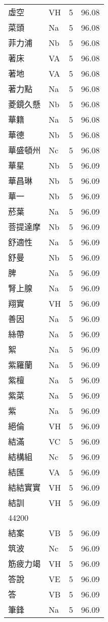 \documentclass[twocolumn]{book}
\begin{document}
\begin{supertabular}{llrr}
虛空 & VH & 5 &  96.08\\
菜頭 & Na & 5 &  96.08\\
菲力浦 & Nb & 5 &  96.08\\
著床 & VA & 5 &  96.08\\
著地 & VA & 5 &  96.08\\
著力點 & Na & 5 &  96.08\\
菱鏡久懸 & Nb & 5 &  96.08\\
華籍 & Na & 5 &  96.08\\
華德 & Nb & 5 &  96.08\\
華盛頓州 & Nc & 5 &  96.08\\
華星 & Nb & 5 &  96.09\\
華昌琳 & Nb & 5 &  96.09\\
華一 & Nb & 5 &  96.09\\
菸葉 & Na & 5 &  96.09\\
菩提達摩 & Nb & 5 &  96.09\\
舒適性 & Na & 5 &  96.09\\
舒曼 & Nb & 5 &  96.09\\
脾 & Na & 5 &  96.09\\
腎上腺 & Na & 5 &  96.09\\
翔實 & VH & 5 &  96.09\\
善因 & Na & 5 &  96.09\\
絲帶 & Na & 5 &  96.09\\
絮 & Na & 5 &  96.09\\
紫羅蘭 & Na & 5 &  96.09\\
紫檀 & Na & 5 &  96.09\\
紫菜 & Na & 5 &  96.09\\
紫 & Na & 5 &  96.09\\
絕倫 & VH & 5 &  96.09\\
結滿 & VC & 5 &  96.09\\
結構組 & Nc & 5 &  96.09\\
結匯 & VA & 5 &  96.09\\
結結實實 & VH & 5 &  96.09\\
結訓 & VH & 5 &  96.09\\
44200\\
結案 & VB & 5 &  96.09\\
筑波 & Nc & 5 &  96.09\\
筋疲力竭 & VH & 5 &  96.09\\
答說 & VE & 5 &  96.09\\
答 & VB & 5 &  96.09\\
筆鋒 & Na & 5 &  96.09\\

\end{supertabular}
\end{document}
